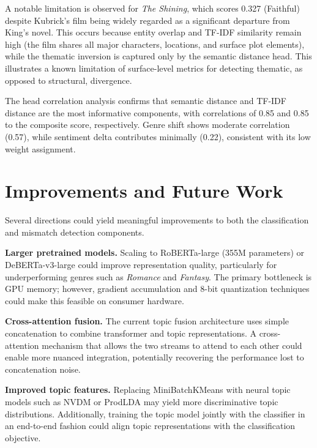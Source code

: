 \documentclass[11pt,a4paper]{article}
\begin{document}
A notable limitation is observed for \textit{The Shining}, which scores 0.327 (Faithful) despite Kubrick's film being widely regarded as a significant departure from King's novel. This occurs because entity overlap and TF-IDF similarity remain high (the film shares all major characters, locations, and surface plot elements), while the thematic inversion is captured only by the semantic distance head. This illustrates a known limitation of surface-level metrics for detecting thematic, as opposed to structural, divergence.

The head correlation analysis confirms that semantic distance and TF-IDF distance are the most informative components, with correlations of 0.85 and 0.85 to the composite score, respectively. Genre shift shows moderate correlation (0.57), while sentiment delta contributes minimally (0.22), consistent with its low weight assignment.

\section{Improvements and Future Work}

Several directions could yield meaningful improvements to both the classification and mismatch detection components.

\textbf{Larger pretrained models.} Scaling to RoBERTa-large (355M parameters) or DeBERTa-v3-large could improve representation quality, particularly for underperforming genres such as \textit{Romance} and \textit{Fantasy}. The primary bottleneck is GPU memory; however, gradient accumulation and 8-bit quantization techniques could make this feasible on consumer hardware.

\textbf{Cross-attention fusion.} The current topic fusion architecture uses simple concatenation to combine transformer and topic representations. A cross-attention mechanism that allows the two streams to attend to each other could enable more nuanced integration, potentially recovering the performance lost to concatenation noise.

\textbf{Improved topic features.} Replacing MiniBatchKMeans with neural topic models such as NVDM or ProdLDA may yield more discriminative topic distributions. Additionally, training the topic model jointly with the classifier in an end-to-end fashion could align topic representations with the classification objective.
\end{document}
